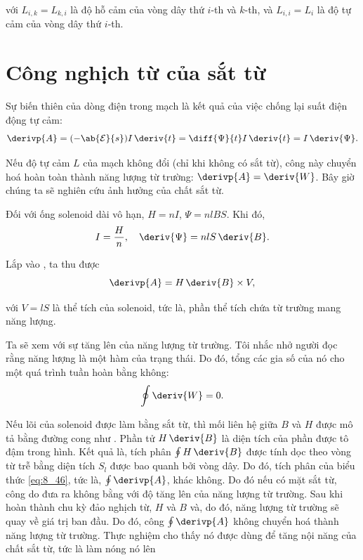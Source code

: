 \noindent
với $L_{i,k}=L_{k,i}$ là độ hỗ cảm của vòng dây thứ $i$-th và $k$-th, và $L_{i,i}=L_i$ là độ tự cảm của vòng dây thứ $i$-th.

\section{Công nghịch từ của sắt từ}\label{sec:8_9}

Sự biến thiên của dòng điện trong mạch là kết quả của việc chống lại suất điện động tự cảm:
\begin{equation}\label{eq:8_45}
	\derivp{A} = (-\ab{\mathcal{E}}{s}) I\, \deriv{t} = \diff{\Psi}{t} I\, \deriv{t} = I\, \deriv{\Psi}.
\end{equation}

\noindent
Nếu độ tự cảm $L$ của mạch không đổi (chỉ khi không có sắt từ), công này chuyển hoá hoàn toàn thành năng lượng từ trường: $\derivp{A}=\deriv{W}$.
Bây giờ chúng ta sẽ nghiên cứu ảnh hưởng của chất sắt từ.

Đối với ống solenoid dài vô hạn, $H=nI$, $\Psi=nlBS$.
Khi đó,
\begin{equation*}
	I = \frac{H}{n},\quad \deriv{\Psi} = nlS\, \deriv{B}.
\end{equation*}

\noindent
Lắp vào , ta thu được
\begin{equation}\label{eq:8_46}
	\derivp{A} = H\, \deriv{B} \times V,
\end{equation}

\noindent
với $V=lS$ là thể tích của solenoid, tức là, phần thể tích chứa từ trường mang năng lượng.

Ta sẽ xem  với sự tăng lên của năng lượng từ trường.
Tôi nhắc nhở người đọc rằng năng lượng là một hàm của trạng thái.
Do đó, tổng các gia số của nó cho một quá trình tuần hoàn bằng không:
\begin{equation*}
	\oint \deriv{W} = 0.
\end{equation*}

\noindent
Nếu lõi của solenoid được làm bằng sắt từ, thì mối liên hệ giữa $B$ và $H$ được mô tả bằng đường cong như .
Phần tử $H\,\deriv{B}$ là diện tích của phần được tô đậm trong hình.
Kết quả là, tích phân $\oint H\,\deriv{B}$ được tính dọc theo vòng từ trễ bằng diện tích $S_l$ được bao quanh bởi vòng dây.
Do đó, tích phân của biểu thức \eqref{eq:8_46}, tức là, $\oint\derivp{A}$, khác không.
Do đó nếu có mặt sắt từ, công do  đưa ra không bằng với độ tăng lên của năng lượng từ trường.
Sau khi hoàn thành chu kỳ đảo nghịch từ, $H$ và $B$ và, do đó, năng lượng từ trường sẽ quay về giá trị ban đầu.
Do đó, công $\oint\derivp{A}$ không chuyển hoá thành năng lượng từ trường.
Thực nghiệm cho thấy nó được dùng để tăng nội năng của chất sắt từ, tức là làm nóng nó lên

